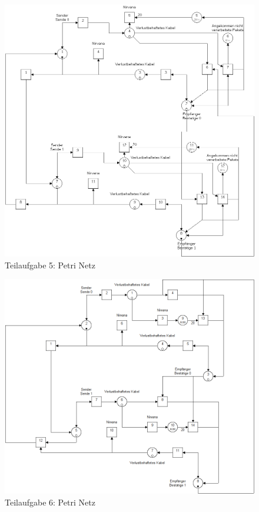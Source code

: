 \documentclass[10pt]{scrartcl}
\begin{document}
	\begin{figure}[H]	
        \includegraphics[width=\textwidth]{praktikum1-aufgabe5.png}
        \caption{Teilaufgabe 5: Petri Netz}  
        \label{img:aufg5}
	\end{figure}


	\begin{figure}[H]
        \includegraphics[width=\textwidth]{praktikum1-aufgabe6.png}
        \caption{Teilaufgabe 6: Petri Netz}   
		\label{img:aufg6}   
	\end{figure}
\end{document}
